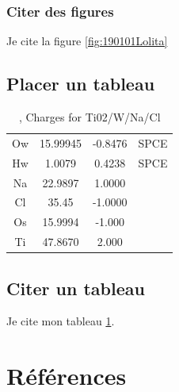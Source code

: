 \documentclass[11pt,a4paper]{article}
\begin{document}
\subsubsection{Citer des figures}
Je cite la figure \ref{fig:190101Lolita}
\subsection{Placer un tableau}
\begin{table}[ht]
\begin{tabular}{cccc}\hline
\hline
Ow& 15.99945& -0.8476&SPCE\\
Hw&  1.0079 &  0.4238&SPCE\\
Na& 22.9897 &  1.0000&\\         
Cl& 35.45   & -1.0000&\\
Os& 15.9994 & -1.000 &\\   
Ti& 47.8670 &  2.000 &\\  
\hline 
\end{tabular}                     
\caption{\label{MonTableau}, Charges for Ti02/W/Na/Cl}
\end{table}
\subsection{Citer un tableau}
Je cite mon tableau \ref{MonTableau}.


\section{Références}

\end{document}
